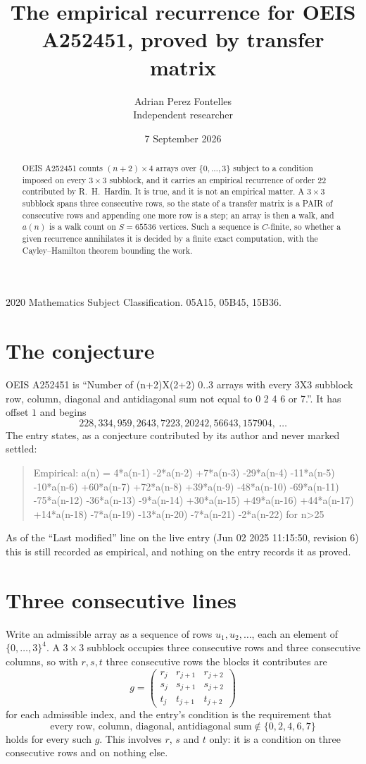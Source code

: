 \documentclass[11pt,a4paper]{article}
\title{The empirical recurrence for OEIS A252451, proved by transfer matrix}
\author{Adrian Perez Fontelles\\ \small Independent researcher}
\date{7 September 2026}
\theoremstyle{plain}
\theoremstyle{definition}
\begin{document}
\maketitle

\begin{abstract}
OEIS A252451 counts $(n+2)\times4$ arrays over $\{0,\dots,3\}$ subject to a condition imposed on
every $3\times3$ subblock, and it carries an empirical recurrence of order $22$
contributed by R.~H.~Hardin. It is true, and it is not an empirical matter. A $3\times3$
subblock spans three consecutive rows, so the state of a transfer matrix is a PAIR of
consecutive rows and appending one more row is a step; an array is then a walk, and
$a(n)$ is a walk count on $S=65536$ vertices. Such a sequence is $C$-finite, so whether a given
recurrence annihilates it is decided by a finite exact computation, with the Cayley--Hamilton
theorem bounding the work.
\end{abstract}

\noindent\small 2020 Mathematics Subject Classification. 05A15, 05B45, 15B36.\normalsize

\section{The conjecture}

OEIS A252451 is ``Number of (n+2)X(2+2) 0..3 arrays with every 3X3 subblock row, column, diagonal and antidiagonal sum not equal to 0 2 4 6 or 7.''. It has offset $1$ and begins
\[
228, 334, 959, 2643, 7223, 20242, 56643, 157904,\ \dots
\]
The entry states, as a conjecture contributed by its author and never marked settled:
\begin{quote}
Empirical: a(n) = 4*a(n-1) -2*a(n-2) +7*a(n-3) -29*a(n-4) -11*a(n-5) -10*a(n-6) +60*a(n-7) +72*a(n-8) +39*a(n-9) -48*a(n-10) -69*a(n-11) -75*a(n-12) -36*a(n-13) -9*a(n-14) +30*a(n-15) +49*a(n-16) +44*a(n-17) +14*a(n-18) -7*a(n-19) -13*a(n-20) -7*a(n-21) -2*a(n-22) for n>25
\end{quote}
As of the ``Last modified'' line on the live entry (Jun 02 2025 11:15:50, revision 6) this is still
recorded as empirical, and nothing on the entry records it as proved.

\section{Three consecutive lines}

Write an admissible array as a sequence of rows $u_1,u_2,\dots$, each an element of
$\{0,\dots,3\}^{4}$. A $3\times3$ subblock occupies three consecutive rows and
three consecutive columns, so with $r,s,t$ three consecutive rows the blocks it
contributes are
\[
g=\begin{pmatrix}r_j&r_{j+1}&r_{j+2}\\ s_j&s_{j+1}&s_{j+2}\\ t_j&t_{j+1}&t_{j+2}\end{pmatrix}
\]
for each admissible index, and the entry's condition is the requirement that
\[
\text{every row, column, diagonal, antidiagonal sum} \notin \{0,2,4,6,7\}
\]
holds for every such $g$. This involves $r$, $s$ and $t$ only: it is a condition on
three consecutive rows and on nothing else.
\end{document}
